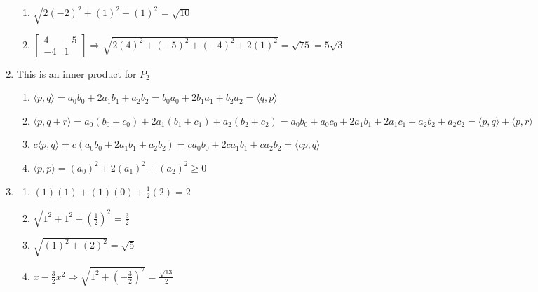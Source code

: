 \documentclass[12pt]{article}
\begin{document}
\begin{enumerate}
\begin{enumerate}
      \item $\sqrt{2(-2)^2+(1)^2+(1)^2}=\sqrt{10}$

      \item $\begin{bmatrix} 4 & -5\\ -4 & 1\end{bmatrix}\Rightarrow \sqrt{2(4)^2+(-5)^2+(-4)^2+2(1)^2}=\sqrt{75}=5\sqrt{3}$

    \end{enumerate}

    \setcounter{enumi}{32}

  \item This is an inner product for $P_2$

    \begin{enumerate}

      \item $\langle p,q\rangle=a_0b_0+2a_1b_1+a_2b_2=b_0a_0+2b_1a_1+b_2a_2=\langle q,p\rangle$ \textcolor{green}{\checkmark}

      \item $\langle p, q+r\rangle=a_0(b_0+c_0)+2a_1(b_1+c_1)+a_2(b_2+c_2)=a_0b_0+a_0c_0+2a_1b_1+2a_1c_1+a_2b_2+a_2c_2=\langle p,q\rangle+\langle p,r\rangle$ \textcolor{green}{\checkmark}

      \item $c\langle p,q\rangle=c(a_0b_0+2a_1b_1+a_2b_2)=ca_0b_0+2ca_1b_1+ca_2b_2=\langle cp,q\rangle$ \textcolor{green}{\checkmark}

      \item $\langle p,p\rangle=(a_0)^2+2(a_1)^2+(a_2)^2 \geq 0$ \textcolor{green}{\checkmark}

    \end{enumerate}

    \setcounter{enumi}{35}

  \item

    \begin{enumerate}

      \item $(1)(1)+(1)(0)+\frac{1}{2}(2)=2$

      \item $\sqrt{1^2+1^2+\left(\frac{1}{2}\right)^2}=\frac{3}{2}$

      \item $\sqrt{(1)^2+(2)^2}=\sqrt{5}$

      \item $x-\frac{3}{2}x^2\Rightarrow\sqrt{1^2+\left( -\frac{3}{2} \right)^2}=\frac{\sqrt{13}}{2}$


\end{enumerate}
\end{enumerate}
\end{document}
